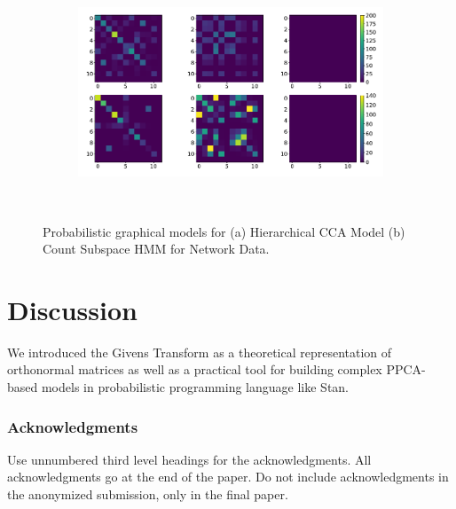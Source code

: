 \documentclass{article}
\begin{document}
\begin{figure}
    \centering
    \begin{subfigure}[b]{0.45\textwidth}
        \includegraphics[width=\textwidth]{heatmap.pdf}
        \caption{}
        \label{fig:CCA}
    \end{subfigure}
    ~ %
    \begin{subfigure}[b]{0.45\textwidth}
        \caption{}
        \label{fig:HMM}
    \end{subfigure}
    \caption{Probabilistic graphical models for (a) Hierarchical CCA Model (b) Count Subspace HMM for Network Data.}\label{fig:ccaResults}
\end{figure}

\section{Discussion}
We introduced the Givens Transform as a theoretical representation of orthonormal matrices as well as a practical tool for building complex PPCA-based models in probabilistic programming language like Stan.

\subsubsection*{Acknowledgments}

Use unnumbered third level headings for the acknowledgments. All
acknowledgments go at the end of the paper. Do not include
acknowledgments in the anonymized submission, only in the final paper.

\end{document}
